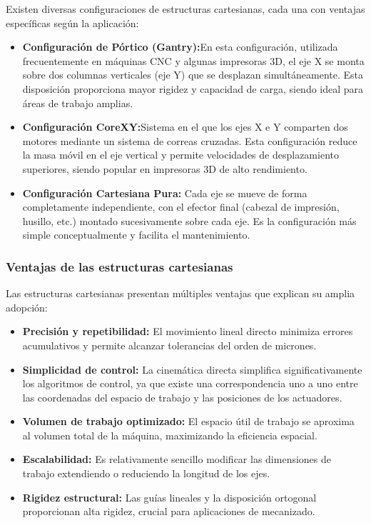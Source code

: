 Existen diversas configuraciones de estructuras cartesianas, cada una con ventajas específicas según la aplicación:
\begin{itemize}[label=$\bullet$]
    \item \textbf{Configuración de Pórtico (Gantry):}En esta configuración, utilizada frecuentemente en máquinas CNC y algunas impresoras 3D, el eje X se monta sobre dos columnas verticales (eje Y) que se desplazan simultáneamente. Esta disposición proporciona mayor rigidez y capacidad de carga, siendo ideal para áreas de trabajo amplias.
    \item \textbf{Configuración CoreXY:}Sistema en el que los ejes X e Y comparten dos motores mediante un sistema de correas cruzadas. Esta configuración reduce la masa móvil en el eje vertical y permite velocidades de desplazamiento superiores, siendo popular en impresoras 3D de alto rendimiento.
    \item \textbf{Configuración Cartesiana Pura:} Cada eje se mueve de forma completamente independiente, con el efector final (cabezal de impresión, husillo, etc.) montado sucesivamente sobre cada eje. Es la configuración más simple conceptualmente y facilita el mantenimiento.
\end{itemize}

\subsubsection{Ventajas de las estructuras cartesianas}

Las estructuras cartesianas presentan múltiples ventajas que explican su amplia adopción:

\begin{itemize}[label=$\bullet$]
    \item \textbf{Precisión y repetibilidad:} El movimiento lineal directo minimiza errores acumulativos y permite alcanzar tolerancias del orden de micrones.

    \item \textbf{Simplicidad de control:} La cinemática directa simplifica significativamente los algoritmos de control, ya que existe una correspondencia uno a uno entre las coordenadas del espacio de trabajo y las posiciones de los actuadores.

    \item \textbf{Volumen de trabajo optimizado:} El espacio útil de trabajo se aproxima al volumen total de la máquina, maximizando la eficiencia espacial.

    \item \textbf{Escalabilidad:} Es relativamente sencillo modificar las dimensiones de trabajo extendiendo o reduciendo la longitud de los ejes.

    \item \textbf{Rigidez estructural:} Las guías lineales y la disposición ortogonal proporcionan alta rigidez, crucial para aplicaciones de mecanizado.
\end{itemize}

